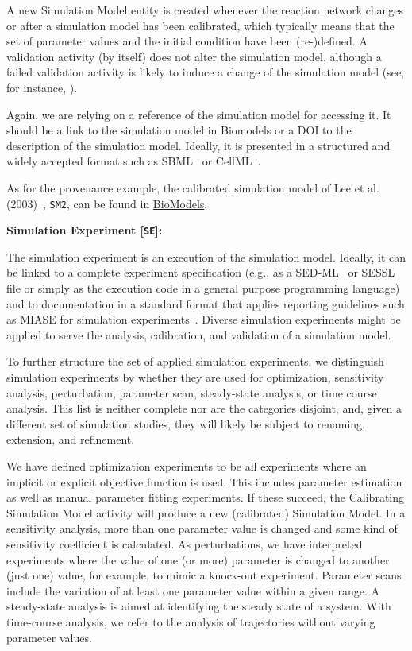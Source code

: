 \documentclass[10pt,letterpaper]{article}
\newcommand{\lee}{Lee et al. (2003)}
\newcommand{\SM}{Simulation Model}
\newcommand{\SE}{Simulation Experiment}
\newcommand{\CSM}{Calibrating Simulation Model}
\begin{document}
A new \SM{} entity is created whenever the reaction network changes or after a simulation model has been calibrated, which typically means that the set of parameter values and the initial condition have been (re-)defined.
A validation activity (by itself) does not alter the simulation model, although a failed validation activity is likely to induce a change of the simulation model (see, for instance, \cite{Haack2020}).

Again, we are relying on a reference of the simulation model for accessing it.
It should be a link to the simulation model in Biomodels or a DOI to the description of the simulation model.
Ideally, it is presented in a structured and widely accepted format such as SBML~\cite{Hucka2003} or CellML~\cite{Lloyd2004}.

As for the provenance example, the calibrated simulation model of \lee{}~\cite{Lee2003}, \texttt{SM2}, can be found in \href{https://www.ebi.ac.uk/biomodels/BIOMD0000000658}{BioModels}.


\textbf{\SE{} [\texttt{SE}]:}

\noindent The simulation experiment is an execution of the simulation model.
Ideally, it can be linked to a complete experiment specification (e.g., as a SED-ML~\cite{Koehn2008} or SESSL~\cite{Ewald2014} file or simply as the execution code in a general purpose programming language) and to documentation in a standard format that applies reporting guidelines such as MIASE for simulation experiments~\cite{Waltemath2011}.
Diverse simulation experiments might be applied to serve the analysis, calibration, and validation of a simulation model.

To further structure the set of applied simulation experiments, we distinguish simulation experiments by whether they are used for optimization, sensitivity analysis, perturbation, parameter scan, steady-state analysis, or time course analysis.
This list is neither complete nor are the categories disjoint, and, given a different set of simulation studies, they will likely be subject to renaming, extension, and refinement.

We have defined optimization experiments to be all experiments where an implicit or explicit objective function is used.
This includes parameter estimation as well as manual parameter fitting experiments.
If these succeed, the \CSM{} activity will produce a new (calibrated) \SM{}.
In a sensitivity analysis, more than one parameter value is changed and some kind of sensitivity coefficient is calculated.
As perturbations, we have interpreted experiments where the value of one (or more) parameter is changed to another (just one) value, for example, to mimic a knock-out experiment.
Parameter scans include the variation of at least one parameter value within a given range.
A steady-state analysis is aimed at identifying the steady state of a system.
With time-course analysis, we refer to the analysis of trajectories without varying parameter values.
\end{document}
